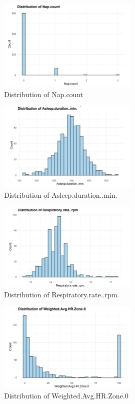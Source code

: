 \documentclass{article}
\begin{document}
\begin{figure}[h!]
  \centering
  \includegraphics[width=0.6\textwidth]{images/Nap_count.png}
  \caption{Distribution of Nap.count}
  \label{fig:nap_count}
\end{figure}

\begin{figure}[h!]
  \centering
  \includegraphics[width=0.6\textwidth]{images/Asleep_duration_min.png}
  \caption{Distribution of Asleep.duration..min.}
  \label{fig:asleep_duration}
\end{figure}

\begin{figure}[h!]
  \centering
  \includegraphics[width=0.6\textwidth]{images/Respiratory_rate_rpm.png}
  \caption{Distribution of Respiratory.rate..rpm.}
  \label{fig:respiratory_rate}
\end{figure}

\begin{figure}[h!]
  \centering
  \includegraphics[width=0.6\textwidth]{images/Weighted_Avg_HR_Zone_0.png}
  \caption{Distribution of Weighted.Avg.HR.Zone.0}
  \label{fig:weighted_avg_hr_zone_0}
\end{figure}
\end{document}
